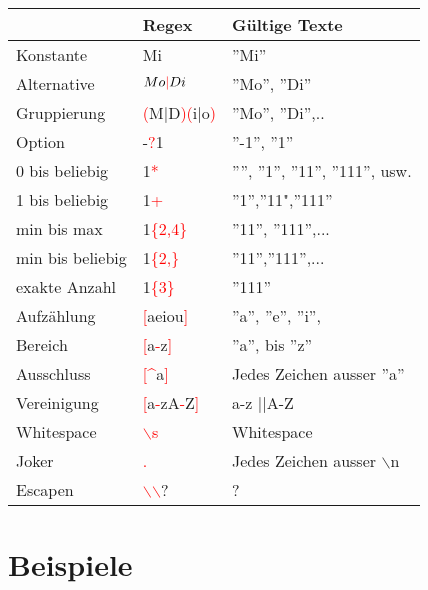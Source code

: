 \begin{multicols*}{5}
\begin{center}
	\begin{tabular}{| p{1.8cm} p{.8cm} p{1.6cm}|}
		\hline
		&Regex&Gültige Texte\\
		\hline
		\hline
		Konstante&Mi&''Mi''\\
		\hline
		Alternative&$Mo\textcolor{red}{|}Di$&''Mo'', ''Di''\\
		\hline
		Gruppierung&\textcolor{red}{(}M$|$D\textcolor{red}{)(}i$|$o\textcolor{red}{)}&''Mo'', ''Di'',..\\
		\hline
		Option&-\textcolor{red}{?}1&''-1'', ''1''\\
		\hline
		0 bis beliebig&1\textcolor{red}{*}&'''', ''1'', ''11'', ''111'', usw.\\
		\hline
		1 bis beliebig&1\textcolor{red}{+}&''1'',''11",''111''\\
		\hline
		min bis max&1\textcolor{red}{\{2,4\}}&''11'', ''111'',...\\
		\hline
		min bis beliebig&1\textcolor{red}{\{2,\}}&''11'',''111'',...\\
		\hline
		exakte Anzahl&1\textcolor{red}{\{3\}}&''111''\\
		\hline
		Aufzählung&\textcolor{red}{[}aeiou\textcolor{red}{]}&''a'', ''e'', ''i'',\\
		\hline
		Bereich&\textcolor{red}{[}a\textcolor{red}{-}z\textcolor{red}{]}&''a'', bis ''z''\\
		\hline
		Ausschluss&\textcolor{red}{[\textasciicircum}a\textcolor{red}{]}&Jedes Zeichen ausser ''a''\\
		\hline
		Vereinigung&\textcolor{red}{[}a\textcolor{red}{-}zA\textcolor{red}{-}Z\textcolor{red}{]}&a-z ||A-Z\\
		\hline
		Whitespace&\textcolor{red}{$\backslash$s}&Whitespace\\
		\hline
		Joker&\textcolor{red}{.}&Jedes Zeichen ausser $\backslash$n\\
		\hline
		Escapen&\textcolor{red}{$\backslash$$\backslash$}?&?\\
		\hline
	\end{tabular}
\end{center}

\vspace{-10pt}





\section{Beispiele}

\end{multicols*}
